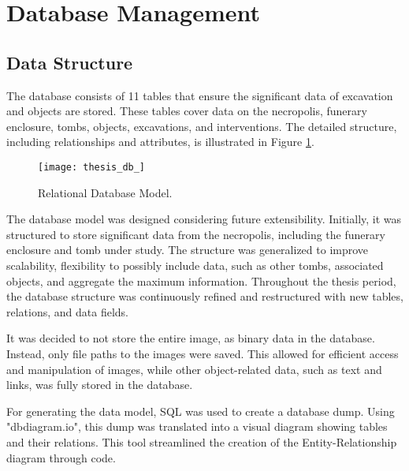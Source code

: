 \section{Database Management}
\subsection{Data Structure}

The database consists of 11 tables that ensure the significant data of excavation and objects are stored. %
These tables cover data on the necropolis, funerary enclosure, tombs, objects, excavations, and interventions.
The detailed structure, including relationships and attributes, is illustrated in Figure \ref{fig:database}.

\begin{figure}[h!]
    \centering
    \texttt{[image: thesis\_db\_]}
    \caption{Relational Database Model.} 
    \label{fig:database}
\end{figure}


The database model was designed considering future extensibility. Initially, it was structured to store significant data from the necropolis, including the funerary enclosure and tomb under study. The structure was generalized to improve scalability, flexibility to possibly include data, such as other tombs, associated objects, and aggregate the maximum information. 
Throughout the thesis period, the database structure was continuously refined and restructured with new tables, relations, and data fields.

It was decided to not store the entire image, as binary data in the database. Instead, only file paths to the images were saved. This allowed for efficient access and manipulation of images, while other object-related data, such as text and links, was fully stored in the database.

For generating the data model, SQL was used to create a database dump.
Using "dbdiagram.io", this dump was translated into a visual diagram showing tables and their relations. This tool streamlined the creation of the Entity-Relationship diagram through code.


